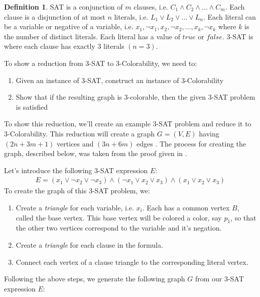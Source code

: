 \documentclass{article}
\theoremstyle{definition}
\newtheorem{definition}{Definition}
\begin{document}
\begin{definition}\label{def:sat}
SAT is a conjunction of $m$ clauses, i.e. $C_1 \wedge C_2 \wedge \dots \wedge C_m$. Each clause is a disjunction of at most $n$ literals, i.e. $L_1 \vee L_2 \vee \dots \vee L_n$. Each literal can be a variable or negative of a variable, i.e. $x_1, \neg x_1, x_2, \neg x_2, \dots , x_k, \neg x_k$ where $k$ is the number of distinct literals. Each literal has a value of $true$ or $false$. 3-SAT is where each clause has exactly 3 literals \((n = 3)\).
\end{definition}

To show a reduction from 3-SAT to 3-Colorability, we need to:

\begin{enumerate}
\item Given an instance of 3-SAT, construct an instance of 3-Colorability
\item Show that if the resulting graph is 3-colorable, then the given 3-SAT problem is satisfied
\end{enumerate}

To show this reduction, we'll create an example 3-SAT problem and reduce it to 3-Colorability. This reduction will create a graph \(G = (V, E)\) having \((2n + 3m + 1)\) vertices and \((3n+6m)\) edges \cite{moret}. The process for creating the graph, described below, was taken from the proof given in \cite{sharma}.

Let's introduce the following 3-SAT expression $E$:
%
\begin{align*}
E = \left( x_1 \vee \neg x_2 \vee \neg x_3 \right) \wedge \left( \neg x_1 \vee x_2 \vee x_3 \right) \wedge \left( x_1 \vee x_2 \vee x_3 \right)
\end{align*}
%
To create the graph of this 3-SAT problem, we:
\begin{enumerate}
\item Create a \emph{triangle} for each variable, i.e. \(x_i\). Each has a common vertex \(B\), called the base vertex. This base vertex will be colored a color, say \(p_1\), so that the other two vertices correspond to the variable and it's negation.
\item Create a \emph{triangle} for each clause in the formula.
\item Connect each vertex of a clause triangle to the corresponding literal vertex.
\end{enumerate}

Following the above steps, we generate the following graph $G$ from our 3-SAT expression $E$:
\end{document}
